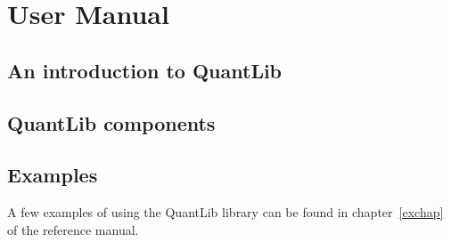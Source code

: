 
\hypertarget{usermanual}{}\part{User Manual}\label{usermanual}

\hypertarget{qlintro}{}\chapter{An introduction to QuantLib}\label{qlintro}










\hypertarget{frameworks}{}\chapter{QuantLib components}\label{components}













\hypertarget{exlink}{}\chapter{Examples}\label{exlink}
A few examples of using the QuantLib library can be found in
chapter~\ref{exchap} of the reference manual.
